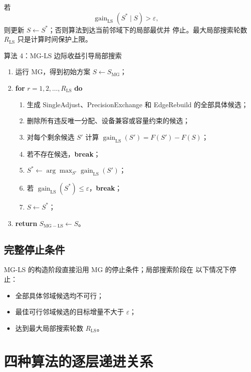 \documentclass[UTF8,12pt,a4paper]{ctexart}
\newcommand{\Alg}[1]{\textsc{#1}}
\newcommand{\eps}{\varepsilon}
\begin{document}
若
\[
\operatorname{gain}_{\mathrm{LS}}(S^*\mid S)>\eps,
\]
则更新 \(S\leftarrow S^*\)；否则算法到达当前邻域下的局部最优并
停止。最大局部搜索轮数 \(R_{\mathrm{LS}}\) 只是计算时间保护上限。

\begin{algobox}{算法 4：\Alg{MG-LS} 边际收益引导局部搜索}
\begin{enumerate}[label=\arabic*.,leftmargin=2.4em]
  \item 运行 \Alg{MG}，得到初始方案 \(S\leftarrow S_{\mathrm{MG}}\)；
  \item \textbf{for} \(r=1,2,\ldots,R_{\mathrm{LS}}\) \textbf{do}
        \begin{enumerate}[label*=\arabic*.,leftmargin=2.6em]
          \item 生成 SingleAdjust、PrecisionExchange 和 EdgeRebuild
                的全部具体候选；
          \item 删除所有违反唯一分配、设备兼容或容量约束的候选；
          \item 对每个剩余候选 \(S'\) 计算
                \(\operatorname{gain}_{\mathrm{LS}}(S')=F(S')-F(S)\)；
          \item 若不存在候选，\textbf{break}；
          \item \(S^*\leftarrow\arg\max_{S'}\operatorname{gain}_{\mathrm{LS}}(S')\)；
          \item 若 \(\operatorname{gain}_{\mathrm{LS}}(S^*)\leq\eps\)，\textbf{break}；
          \item \(S\leftarrow S^*\)；
        \end{enumerate}
  \item \textbf{return} \(S_{\mathrm{MG-LS}}\leftarrow S\)。
\end{enumerate}
\end{algobox}

\subsection{完整停止条件}

\Alg{MG-LS} 的构造阶段直接沿用 \Alg{MG} 的停止条件；局部搜索阶段在
以下情况下停止：
\begin{itemize}
  \item 全部具体邻域候选均不可行；
  \item 最佳可行邻域候选的目标增量不大于 \(\eps\)；
  \item 达到最大局部搜索轮数 \(R_{\mathrm{LS}}\)。
\end{itemize}

\section{四种算法的逐层递进关系}
\end{document}
